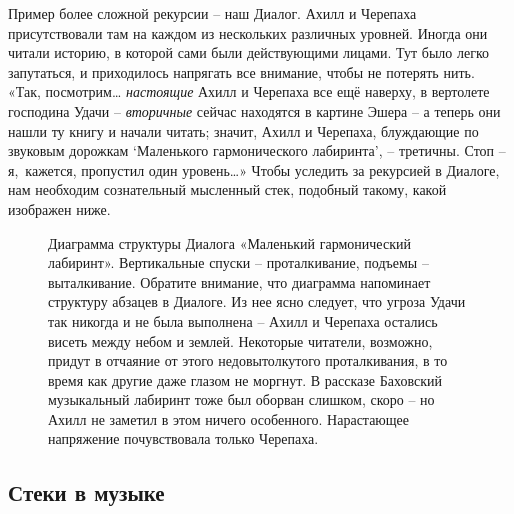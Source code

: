 \documentclass[../main.tex]{subfiles}
\begin{document}
Пример более сложной рекурсии \--- наш Диалог. Ахилл и Черепаха присутствовали там на каждом из нескольких различных уровней. Иногда они читали историю, в которой сами были действующими лицами. Тут было легко запутаться, и приходилось напрягать все внимание, чтобы не потерять нить. «Так, посмотрим\ldots{} \emph{настоящие} Ахилл и Черепаха все ещё наверху, в вертолете господина Удачи \--- \emph{вторичные} сейчас находятся в картине Эшера \--- а теперь они нашли ту книгу и начали читать; значит, Ахилл и Черепаха, блуждающие по звуковым дорожкам \enquote*{Маленького гармонического лабиринта}, \--- третичны. Стоп \--- я,~кажется, пропустил один уровень\ldots» Чтобы уследить за рекурсией в Диалоге, нам необходим сознательный мысленный стек, подобный такому, какой изображен ниже.

\begin{figure}
    \centering
    \begin{adjustbox}{max width=\linewidth}
        
    \end{adjustbox}
    \caption{Диаграмма структуры Диалога «Маленький гармонический лабиринт». Вертикальные спуски \--- проталкивание, подъемы \--- выталкивание. Обратите внимание, что диаграмма напоминает структуру абзацев в Диалоге. Из нее ясно следует, что угроза Удачи так никогда и не была выполнена \--- Ахилл и Черепаха остались висеть между небом и землей. Некоторые читатели, возможно, придут в отчаяние от этого недовытолкутого проталкивания, в то время как другие даже глазом не моргнут. В рассказе Баховский музыкальный лабиринт тоже был оборван слишком, скоро \--- но Ахилл не заметил в этом ничего особенного. Нарастающее напряжение почувствовала только Черепаха.}
    \label{fig:diagram-dialogue-labirinth}
\end{figure}


\subsection{Стеки в музыке}
\end{document}

